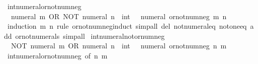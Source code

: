 \begin{isabellebody}
\isanewline
{}\isamarkupfalse%
\ int{\isacharunderscore}{\kern0pt}numeral{\isacharunderscore}{\kern0pt}or{\isacharunderscore}{\kern0pt}not{\isacharunderscore}{\kern0pt}num{\isacharunderscore}{\kern0pt}neg{\isacharcolon}{\kern0pt}\isanewline
\ \ {\isacartoucheopen}numeral\ m\ OR\ NOT\ {\isacharparenleft}{\kern0pt}numeral\ n\ {\isacharcolon}{\kern0pt}{\isacharcolon}{\kern0pt}\ int{\isacharparenright}{\kern0pt}\ {\isacharequal}{\kern0pt}\ {\isacharminus}{\kern0pt}\ numeral\ {\isacharparenleft}{\kern0pt}or{\isacharunderscore}{\kern0pt}not{\isacharunderscore}{\kern0pt}num{\isacharunderscore}{\kern0pt}neg\ m\ n{\isacharparenright}{\kern0pt}{\isacartoucheclose}\isanewline
%
\isadelimproof
\ \ %
\endisadelimproof
%
\isatagproof
{}\isamarkupfalse%
\ {\isacharparenleft}{\kern0pt}induction\ m\ n\ rule{\isacharcolon}{\kern0pt}\ or{\isacharunderscore}{\kern0pt}not{\isacharunderscore}{\kern0pt}num{\isacharunderscore}{\kern0pt}neg{\isachardot}{\kern0pt}induct{\isacharparenright}{\kern0pt}\ {\isacharparenleft}{\kern0pt}simp{\isacharunderscore}{\kern0pt}all\ del{\isacharcolon}{\kern0pt}\ not{\isacharunderscore}{\kern0pt}numeral{\isacharunderscore}{\kern0pt}eq\ not{\isacharunderscore}{\kern0pt}one{\isacharunderscore}{\kern0pt}eq\ add{\isacharcolon}{\kern0pt}\ or{\isacharunderscore}{\kern0pt}not{\isacharunderscore}{\kern0pt}numerals{\isacharcomma}{\kern0pt}\ simp{\isacharunderscore}{\kern0pt}all{\isacharparenright}{\kern0pt}%
\endisatagproof
{\isafoldproof}%
%
\isadelimproof
\isanewline
%
\endisadelimproof
\isanewline
{}\isamarkupfalse%
\ int{\isacharunderscore}{\kern0pt}numeral{\isacharunderscore}{\kern0pt}not{\isacharunderscore}{\kern0pt}or{\isacharunderscore}{\kern0pt}num{\isacharunderscore}{\kern0pt}neg{\isacharcolon}{\kern0pt}\isanewline
\ \ {\isacartoucheopen}NOT\ {\isacharparenleft}{\kern0pt}numeral\ m{\isacharparenright}{\kern0pt}\ OR\ {\isacharparenleft}{\kern0pt}numeral\ n\ {\isacharcolon}{\kern0pt}{\isacharcolon}{\kern0pt}\ int{\isacharparenright}{\kern0pt}\ {\isacharequal}{\kern0pt}\ {\isacharminus}{\kern0pt}\ numeral\ {\isacharparenleft}{\kern0pt}or{\isacharunderscore}{\kern0pt}not{\isacharunderscore}{\kern0pt}num{\isacharunderscore}{\kern0pt}neg\ n\ m{\isacharparenright}{\kern0pt}{\isacartoucheclose}\isanewline
%
\isadelimproof
\ \ %
\endisadelimproof
%
\isatagproof
{}\isamarkupfalse%
\ int{\isacharunderscore}{\kern0pt}numeral{\isacharunderscore}{\kern0pt}or{\isacharunderscore}{\kern0pt}not{\isacharunderscore}{\kern0pt}num{\isacharunderscore}{\kern0pt}neg\ {\isacharbrackleft}{\kern0pt}of\ n\ m{\isacharbrackright}{\kern0pt}\ \isamarkupfalse%

\end{isabellebody}
